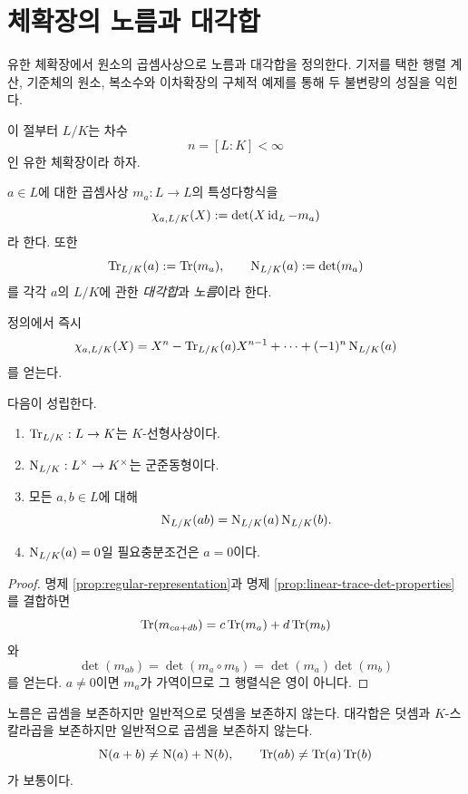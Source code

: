 \clearpage
\section{체확장의 노름과 대각합}
\label{sec:norm-trace-definitions}

\begin{learninggoal}
유한 체확장에서 원소의 곱셈사상으로 노름과 대각합을 정의한다. 기저를 택한 행렬 계산, 기준체의 원소, 복소수와 이차확장의 구체적 예제를 통해 두 불변량의 성질을 익힌다.
\end{learninggoal}

이 절부터 $L/K$는 차수
\[
  n=[L:K]<\infty
\]
인 유한 체확장이라 하자.

\begin{definition}
\label{def:field-norm-trace}
$a\in L$에 대한 곱셈사상 $m_a:L\to L$의 특성다항식을
\[
  \chi_{a,L/K}(X)
  :=\det(X\operatorname{id}_L-m_a)
\]
라 한다. 또한
\[
  \operatorname{Tr}_{L/K}(a):=\operatorname{Tr}(m_a),
  \qquad
  \operatorname{N}_{L/K}(a):=\det(m_a)
\]
를 각각 $a$의 $L/K$에 관한 \emph{대각합}과 \emph{노름}이라 한다.
\end{definition}

정의에서 즉시
\[
  \chi_{a,L/K}(X)
  =X^n-\operatorname{Tr}_{L/K}(a)X^{n-1}
  +\cdots+(-1)^n\operatorname{N}_{L/K}(a)
\]
를 얻는다.

\begin{proposition}
\label{prop:norm-trace-basic-properties}
다음이 성립한다.
\begin{enumerate}[label=(\roman*)]
  \item $\operatorname{Tr}_{L/K}:L\to K$는 $K$-선형사상이다.
  \item $\operatorname{N}_{L/K}:L^\times\to K^\times$는 군준동형이다.
  \item 모든 $a,b\in L$에 대해
  \[
    \operatorname{N}_{L/K}(ab)
    =\operatorname{N}_{L/K}(a)\operatorname{N}_{L/K}(b).
  \]
  \item $\operatorname{N}_{L/K}(a)=0$일 필요충분조건은 $a=0$이다.
\end{enumerate}
\end{proposition}

\begin{proof}
명제 \ref{prop:regular-representation}과
명제 \ref{prop:linear-trace-det-properties}를 결합하면
\[
  \operatorname{Tr}(m_{ca+db})
  =c\operatorname{Tr}(m_a)+d\operatorname{Tr}(m_b)
\]
와
\[
  \det(m_{ab})
  =\det(m_a\circ m_b)
  =\det(m_a)\det(m_b)
\]
를 얻는다. $a\ne0$이면 $m_a$가 가역이므로 그 행렬식은 영이 아니다.
\end{proof}

\begin{pitfall}
노름은 곱셈을 보존하지만 일반적으로 덧셈을 보존하지 않는다.
대각합은 덧셈과 $K$-스칼라곱을 보존하지만 일반적으로 곱셈을 보존하지 않는다.
\[
  \operatorname{N}(a+b)\ne\operatorname{N}(a)+\operatorname{N}(b),
  \qquad
  \operatorname{Tr}(ab)\ne\operatorname{Tr}(a)\operatorname{Tr}(b)
\]
가 보통이다.
\end{pitfall}

